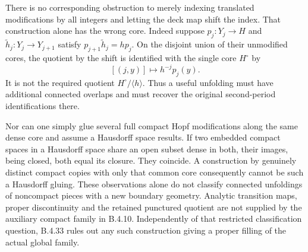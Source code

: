 \begin{remark}
There is no corresponding obstruction to merely indexing translated
modifications by all integers and letting the deck map shift the
index. That construction alone has the wrong core. Indeed suppose
$p_j:Y_j\to H$ and
$\widetilde h_j:Y_j\to Y_{j+1}$ satisfy
$p_{j+1}\widetilde h_j=hp_j$.
On the disjoint union of their unmodified cores, the quotient by
the shift is identified with the single core $H^\circ$ by
\[
 [(j,y)]\longmapsto h^{-j}p_j(y).
\]
It is not the required quotient $H^\circ/\langle h\rangle$.
Thus a useful unfolding must have additional connected overlaps
and must recover the original second-period identifications there.

Nor can one simply glue several full compact Hopf modifications
along the same dense core and assume a Hausdorff space results.
If two embedded compact spaces in a Hausdorff space share an open
subset dense in both, their images, being closed, both equal its
closure. They coincide. A construction by genuinely distinct
compact copies with only that common core consequently cannot be
such a Hausdorff gluing.
These observations alone do not classify connected unfoldings
of noncompact pieces with a new boundary geometry. Analytic
transition maps, proper discontinuity and the retained punctured
quotient are not supplied by the auxiliary compact family in
B.4.10. Independently of that restricted classification question,
B.4.33 rules out any such construction giving a proper filling
of the actual global family.
\end{remark}
